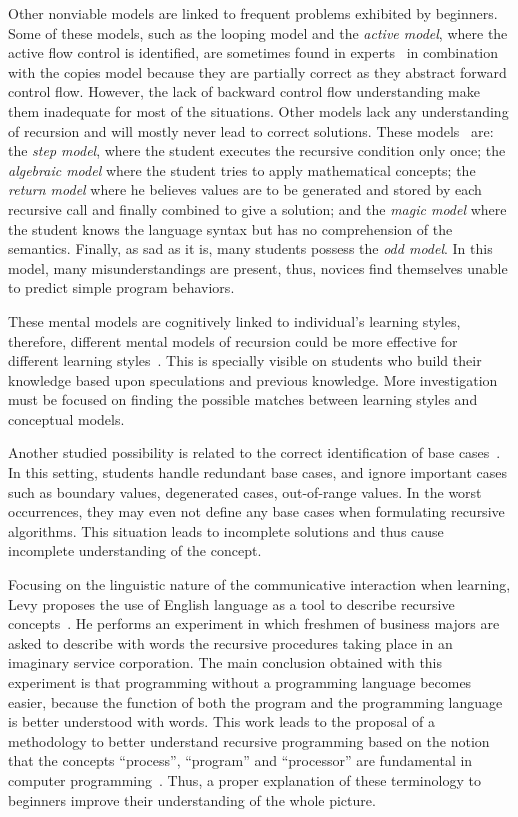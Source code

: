 Other nonviable models are linked to frequent problems exhibited by
beginners. Some of these models, such as the looping model and the
\emph{active model}, where the active flow control is identified, are
sometimes found in experts~\cite{GotschiSandersGalpin:2003} in
combination with the copies model because they are partially correct
as they abstract forward control flow. However, the lack of backward
control flow understanding make them inadequate for most of the
situations. Other models lack any understanding of recursion and will
mostly never lead to correct solutions. These
models~\cite{GotschiSandersGalpin:2003} are: the \emph{step model}, where
the student executes the recursive condition only once; the
\emph{algebraic model} where the student tries to apply mathematical
concepts; the \emph{return model} where he believes values are to be
generated and stored by each recursive call and finally combined to
give a solution; and the \emph{magic model} where the student knows the
language syntax but has no comprehension of the semantics. Finally,
as sad as it is, many students possess the \emph{odd model}. In this
model, many misunderstandings are present, thus,
novices find themselves unable to predict simple program behaviors.

These mental models are cognitively linked to individual's learning
styles, therefore, different mental models of recursion could be
more effective for different learning
styles~\cite{WuDaleBethel:1998}. This is specially visible on
students who build their knowledge based upon speculations and
previous knowledge. More investigation must be focused on finding
the possible matches between learning styles and conceptual models.

Another studied possibility is related to the correct identification
of base cases~\cite{HabermanAverbuch:2002}. In this setting,
students handle redundant base cases, and ignore important cases such
as boundary values, degenerated cases, out\hyp{}of\hyp{}range values.
In the worst occurrences, they may even not define any base cases when
formulating recursive algorithms. This situation leads to incomplete
solutions and thus cause incomplete understanding of the concept.

Focusing on the linguistic nature of the communicative interaction when
learning, Levy proposes the use of English language as a tool to describe
recursive concepts~\cite{LevyLapidot:2000, LevyLapidotPaz:2001,
  LevyLapidot:2002, Levy:2001}. He performs an experiment in which
freshmen of business majors are asked to describe with words the
recursive procedures taking place in an imaginary service
corporation. The main conclusion obtained with this experiment is
that programming without a programming language becomes easier,
because the function of both the program and the programming language
is better understood with words. This work leads to the proposal of
a methodology to better understand recursive programming based on the
notion that the concepts ``process'', ``program'' and ``processor'' are
fundamental in computer programming~\cite{LevyLapidot:2000}. Thus, a
proper explanation of these terminology to beginners improve their
understanding of the whole picture.

